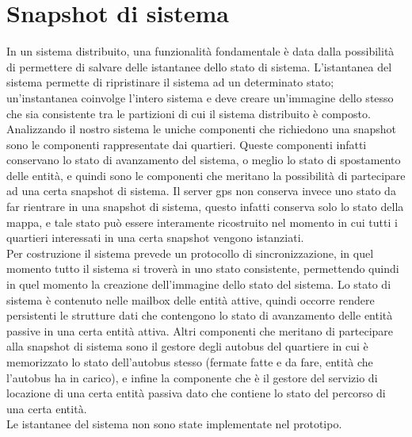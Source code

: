 \section{Snapshot di sistema}
In un sistema distribuito, una funzionalità fondamentale è data dalla possibilità di permettere di salvare delle istantanee dello stato di sistema. L'istantanea del sistema permette di ripristinare il sistema ad un determinato stato; un'instantanea coinvolge l'intero sistema e deve creare un'immagine dello stesso che sia consistente tra le partizioni di cui il sistema distribuito è composto. \\
Analizzando il nostro sistema le uniche componenti che richiedono una snapshot sono le componenti rappresentate dai quartieri. Queste componenti infatti conservano lo stato di avanzamento del sistema, o meglio lo stato di spostamento delle entità, e quindi sono le componenti che meritano la possibilità di partecipare ad una certa snapshot di sistema. Il server gps non conserva invece uno stato da far rientrare in una snapshot di sistema, questo infatti conserva solo lo stato della mappa, e tale stato può essere interamente ricostruito nel momento in cui tutti i quartieri interessati in una certa snapshot vengono istanziati. \\
Per costruzione il sistema prevede un protocollo di sincronizzazione, in quel momento tutto il sistema si troverà in uno stato consistente, permettendo quindi in quel momento la creazione dell'immagine dello stato del sistema. Lo stato di sistema è contenuto nelle mailbox delle entità attive, quindi occorre rendere persistenti le strutture dati che contengono lo stato di avanzamento delle entità passive in una certa entità attiva. Altri componenti che meritano di partecipare alla snapshot di sistema sono il gestore degli autobus del quartiere in cui è memorizzato lo stato dell'autobus stesso (fermate fatte e da fare, entità che l'autobus ha in carico), e infine la componente che è il gestore del servizio di locazione di una certa entità passiva dato che contiene lo stato del percorso di una certa entità.\\
Le istantanee del sistema non sono state implementate nel prototipo.